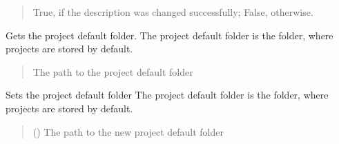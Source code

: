\documentclass[letterpaper,10pt,english]{sphinxmanual}
\begin{document}
\begin{fulllineitems}
\begin{fulllineitems}
\begin{quote}
\begin{description}
\sphinxAtStartPar
True, if the description was changed successfully; False, otherwise.

\sphinxAtStartPar
{}

\end{description}\end{quote}

\end{fulllineitems}


\begin{fulllineitems}
\label{\detokenize{apidoc/src.osm_configurator.control:src.osm_configurator.control.control.Control.get_project_default_folder}}
\pysigstartsignatures
{}
\pysigstopsignatures
\sphinxAtStartPar
Gets the project default folder.
The project default folder is the folder, where projects are stored by default.
\begin{quote}\begin{description}
\sphinxAtStartPar
The path to the project default folder

\sphinxAtStartPar
{}

\end{description}\end{quote}

\end{fulllineitems}


\begin{fulllineitems}
\label{\detokenize{apidoc/src.osm_configurator.control:src.osm_configurator.control.control.Control.set_project_default_folder}}
\pysigstartsignatures
{}
\pysigstopsignatures
\sphinxAtStartPar
Sets the project default folder
The project default folder is the folder, where projects are stored by default.
\begin{quote}\begin{description}
\sphinxAtStartPar
{} () \textendash{} The path to the new project default folder


\end{description}
\end{quote}
\end{fulllineitems}
\end{fulllineitems}
\end{document}
